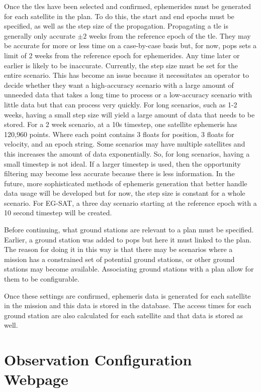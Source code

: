 Once the \glspl{tle} have been selected and confirmed, ephemerides must be
generated for each satellite in the plan. To do this, the start and end epochs
must be specified, as well as the step size of the propagation. Propagating a
\gls{tle} is generally only accurate $\pm 2$ weeks from the reference epoch of
the \gls{tle}. They may be accurate for more or less time on a case-by-case
basis but, for now, \gls{pops} sets a limit of 2 weeks from the reference epoch
for ephemerides. Any time later or earlier is likely to be inaccurate.
Currently, the step size must be set for the entire scenario. This has become
an issue because it necessitates an operator to decide whether they want a
high-accuracy scenario with a large amount of unneeded data that takes a long
time to process or a low-accuracy scenario with little data but that can
process very quickly. For long scenarios, such as 1-2 weeks, having a small
step size will yield a large amount of data that needs to be stored. For a 2
week scenario, at a 10s timestep, one satellite ephemeris has 120,960 points.
Where each point contains 3 floats for position, 3 floats for velocity, and an
epoch string.  Some scenarios may have multiple satellites and this increases
the amount of data exponentially. So, for long scenarios, having a small
timestep is not ideal. If a larger timestep is used, then the opportunity
filtering may become less accurate because there is less information. In the
future, more sophisticated methods of ephemeris generation that better handle
data usage will be developed but for now, the step size is constant for a whole
scenario.  For EG-SAT, a three day scenario starting at the reference epoch with a
10 second timestep will be created.  

Before continuing, what ground stations are relevant to a plan must be
specified.  Earlier, a ground station was added to \gls{pops} but here it must
linked to the plan. The reason for doing it in this way is that there may be
scenarios where a mission has a constrained set of potential ground stations,
or other ground stations may become available. Associating ground stations with
a plan allow for them to be configurable. 

Once these settings are confirmed, ephemeris data is generated for each
satellite in the mission and this data is stored in the database. The access
times for each ground station are also calculated for each satellite and that
data is stored as well.


\section{Observation Configuration Webpage}

